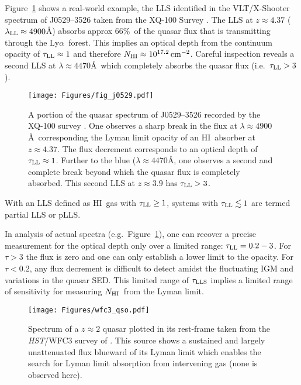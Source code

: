 \documentclass[graybox]{svmult}
\newcommand{\HI}{H{\sc I}}
\def\lya{Ly$\alpha$}
\newcommand{\mnhi}{N_{\rm HI}}
\newcommand{\nhi}{$\mnhi$}
\def\cm#1{\, {\rm cm^{#1}}}
\begin{document}
Figure~\ref{fig:j0529} shows a real-world example, the
LLS identified in the VLT/X-Shooter spectrum of 
J0529--3526 taken from the XQ-100 Survey \cite{lopez16}.
The LLS at $z \approx 4.37$ ($\lambda_{\rm LL} \approx 4900$\AA)
absorbs approx 66\%\ of the quasar flux that is transmitting
through the \lya\ forest.  This implies an optical depth
from the continuum opacity of $\tau_{\rm LL} \approx 1$
and therefore $\mnhi \approx 10^{17.2} \cm{-2}$.
Careful inspection reveals a second LLS at $\lambda \approx 4470$\AA\
which completely absorbs the quasar flux (i.e.\ $\tau_{\rm LL} > 3$).

%
\begin{figure}[b]
\sidecaption
\texttt{[image: Figures/fig\_j0529.pdf]}
%
%
\caption{A portion of the quasar spectrum of J0529--3526 recorded
by the XQ-100 survey \cite{lopez16}.  One observes a sharp break
in the flux at $\lambda \approx 4900$\AA\ corresponding the 
Lyman limit opacity of an \HI\ absorber at $z \approx 4.37$.
The flux decrement corresponds to an optical depth of 
$\tau_{\rm LL} \approx 1$.  Further to the blue 
($\lambda \approx 4470$\AA, one observes
a second and complete break beyond which the quasar flux
is completely absorbed.  This second LLS at $z \approx 3.9$
has $\tau_{\rm LL} > 3$.
}
\label{fig:j0529}       %
\end{figure}

With an LLS defined as \HI\ gas with $\tau_{\rm LL} \ge 1$,
systems with $\tau_{\rm LL} \lesssim 1$ are termed partial
LLS or pLLS.  

In analysis of actual spectra (e.g.\ Figure~\ref{fig:j0529}),
one can recover a precise measurement for the optical depth
only over a limited range: $\tau_{\rm LL} = 0.2 - 3$.  
For $\tau > 3$ the flux is zero and one can only establish
a lower limit to the opacity.
For $\tau < 0.2$, any flux decrement is difficult 
to detect amidst the fluctuating IGM and variations in the quasar SED.
This limited range of $\tau_{\rm LLS}$ implies a limited
range of sensitivity for measuring \nhi\ from the Lyman limit.

%
\begin{figure}[b]
\sidecaption
\texttt{[image: Figures/wfc3\_qso.pdf]}
%
%
\caption{Spectrum of a $z \approx 2$ quasar plotted in its
rest-frame taken from the {\it HST}/WFC3 survey of \cite{omeara13}.
This source shows a sustained and largely unattenuated 
flux blueward of its Lyman limit which enables the search for
Lyman limit absorption from intervening gas (none is observed here).
}
\label{fig:wfc3}       %
\end{figure}
\end{document}
